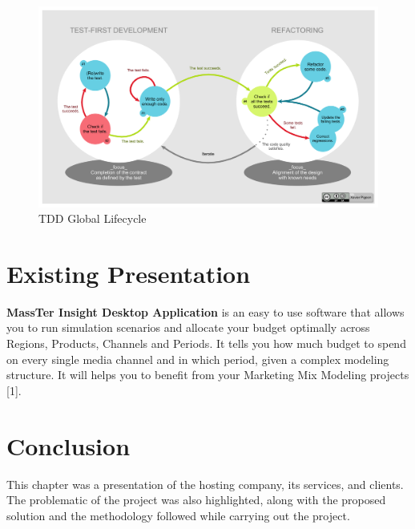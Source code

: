 		\begin{figure}[h]
		\centering
		\includegraphics[width=1\textwidth]{TDD_Global_Lifecycle.png}
		\caption{TDD Global Lifecycle}
	\end{figure}   
	\section{Existing Presentation}
	\textbf{MassTer Insight Desktop Application} is an easy to use software that allows you to run simulation scenarios and allocate your budget optimally across Regions, Products, Channels and Periods. It tells you how much budget to spend on every single media channel and in which period, given a complex modeling structure. It will helps you to benefit from your Marketing Mix Modeling projects [1]. 

	\section{Conclusion}
	This chapter was a presentation of the hosting company, its services, and clients. The problematic of the project was also highlighted, along with the proposed solution and the methodology followed while carrying out the project.
	
	 
	

